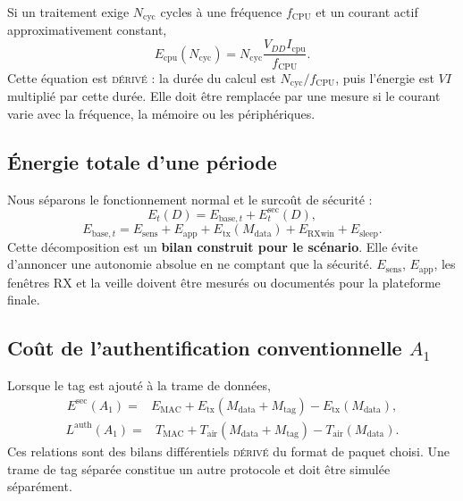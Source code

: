 \documentclass[conference,a4paper]{IEEEtran}
\newcommand{\statusDer}{\textsc{dérivé}}
\newcommand{\ToA}{T_{\mathrm{air}}}
\begin{document}
Si un traitement exige $N_{\mathrm{cyc}}$ cycles à une fréquence $f_{\mathrm{CPU}}$ et un courant actif approximativement constant,
\begin{equation}
E_{\mathrm{cpu}}(N_{\mathrm{cyc}})=N_{\mathrm{cyc}}
\frac{V_{DD}I_{\mathrm{cpu}}}{f_{\mathrm{CPU}}}.
\label{eq:energy-cpu}
\end{equation}
Cette équation est \statusDer{} : la durée du calcul est $N_{\mathrm{cyc}}/f_{\mathrm{CPU}}$, puis l'énergie est $VI$ multiplié par cette durée. Elle doit être remplacée par une mesure si le courant varie avec la fréquence, la mémoire ou les périphériques.

\subsection{Énergie totale d'une période}
Nous séparons le fonctionnement normal et le surcoût de sécurité :
\begin{equation}
    E_t(D)=E_{\mathrm{base},t}+E_t^{\mathrm{sec}}(D),
    \label{eq:total-energy}
\end{equation}
\begin{equation}
E_{\mathrm{base},t}=E_{\mathrm{sens}}+E_{\mathrm{app}}+
E_{\mathrm{tx}}(M_{\mathrm{data}})+E_{\mathrm{RXwin}}+E_{\mathrm{sleep}}.
\label{eq:base-energy}
\end{equation}
Cette décomposition est un \textbf{bilan construit pour le scénario}. Elle évite d'annoncer une autonomie absolue en ne comptant que la sécurité. $E_{\mathrm{sens}}$, $E_{\mathrm{app}}$, les fenêtres RX et la veille doivent être mesurés ou documentés pour la plateforme finale.

\subsection{Coût de l'authentification conventionnelle $A_1$}
Lorsque le tag est ajouté à la trame de données,
\begin{equation}
\begin{split}
E^{\mathrm{sec}}(A_1)={}&E_{\mathrm{MAC}}+
E_{\mathrm{tx}}(M_{\mathrm{data}}+M_{\mathrm{tag}})
-E_{\mathrm{tx}}(M_{\mathrm{data}}),
\end{split}
\label{eq:cost-a1}
\end{equation}
\begin{equation}
\begin{split}
L^{\mathrm{auth}}(A_1)={}&T_{\mathrm{MAC}}+
\ToA(M_{\mathrm{data}}+M_{\mathrm{tag}})-\ToA(M_{\mathrm{data}}).
\end{split}
\end{equation}
Ces relations sont des bilans différentiels \statusDer{} du format de paquet choisi. Une trame de tag séparée constitue un autre protocole et doit être simulée séparément.
\end{document}
